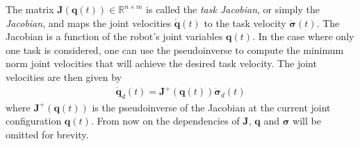 The matrix $\bm{J}(\bm{q}(t)) \in \mathbb{R}^{n \times m}$ is called the
\emph{task Jacobian}, or simply the \emph{Jacobian}, and maps the joint
velocities $\dot{\bm{q}}(t)$ to the task velocity $\dot{\bm{\sigma}}(t)$.
The Jacobian is a function of the robot's joint variables $\bm{q}(t)$.
In the case where only one task is considered, one can use the pseudoinverse
to compute the minimum norm joint velocities that will achieve the desired
task velocity. The joint velocities are then given by
\begin{align}
    \dot{\bm{q}}_d(t) = \bm{J}^{+}(\bm{q}(t)) \dot{\bm{\sigma}}_d(t) \label{eq:task_priority}
\end{align}
where $\bm{J}^{+}(\bm{q}(t))$ is the pseudoinverse of the Jacobian at the current
joint configuration $\bm{q}(t)$. From now on the dependencies of $\bm{J}$, $\bm{q}$
and $\bm{\sigma}$ will be omitted for brevity.

